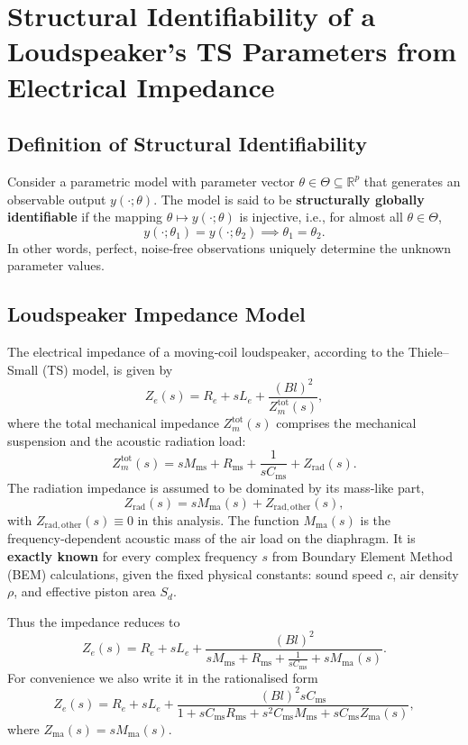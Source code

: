 

\section*{Structural Identifiability of a Loudspeaker's TS Parameters from Electrical Impedance}

\subsection*{Definition of Structural Identifiability}
Consider a parametric model with parameter vector $\theta \in \Theta \subseteq \mathbb{R}^p$ that generates an observable output $y(\cdot;\theta)$. The model is said to be \textbf{structurally globally identifiable} if the mapping $\theta \mapsto y(\cdot;\theta)$ is injective, i.e., for almost all $\theta \in \Theta$,
\[
y(\cdot;\theta_1) = y(\cdot;\theta_2) \implies \theta_1 = \theta_2.
\]
In other words, perfect, noise‑free observations uniquely determine the unknown parameter values.

\subsection*{Loudspeaker Impedance Model}
The electrical impedance of a moving‑coil loudspeaker, according to the Thiele--Small (TS) model, is given by
\[
Z_e(s) = R_e + s L_e + \frac{(Bl)^2}{Z_m^{\mathrm{tot}}(s)},
\]
where the total mechanical impedance $Z_m^{\mathrm{tot}}(s)$ comprises the mechanical suspension and the acoustic radiation load:
\[
Z_m^{\mathrm{tot}}(s) = s M_{\mathrm{ms}} + R_{\mathrm{ms}} + \frac{1}{s C_{\mathrm{ms}}} + Z_{\mathrm{rad}}(s).
\]
The radiation impedance is assumed to be dominated by its mass‑like part,
\[
Z_{\mathrm{rad}}(s) = s M_{\mathrm{ma}}(s) + Z_{\mathrm{rad,other}}(s),
\]
with $Z_{\mathrm{rad,other}}(s) \equiv 0$ in this analysis. The function $M_{\mathrm{ma}}(s)$ is the frequency‑dependent acoustic mass of the air load on the diaphragm. It is \textbf{exactly known} for every complex frequency $s$ from Boundary Element Method (BEM) calculations, given the fixed physical constants: sound speed $c$, air density $\rho$, and effective piston area $S_d$.

Thus the impedance reduces to
\[
\boxed{
Z_e(s) = R_e + s L_e + \frac{(Bl)^2}{s M_{\mathrm{ms}} + R_{\mathrm{ms}} + \frac{1}{s C_{\mathrm{ms}}} + s M_{\mathrm{ma}}(s)}.
}
\]
For convenience we also write it in the rationalised form
\[
Z_e(s) = R_e + s L_e + \frac{(Bl)^2 s C_{\mathrm{ms}}}{1 + s C_{\mathrm{ms}} R_{\mathrm{ms}} + s^2 C_{\mathrm{ms}} M_{\mathrm{ms}} + s C_{\mathrm{ms}} Z_{\mathrm{ma}}(s)},
\]
where $Z_{\mathrm{ma}}(s) = s M_{\mathrm{ma}}(s)$.

